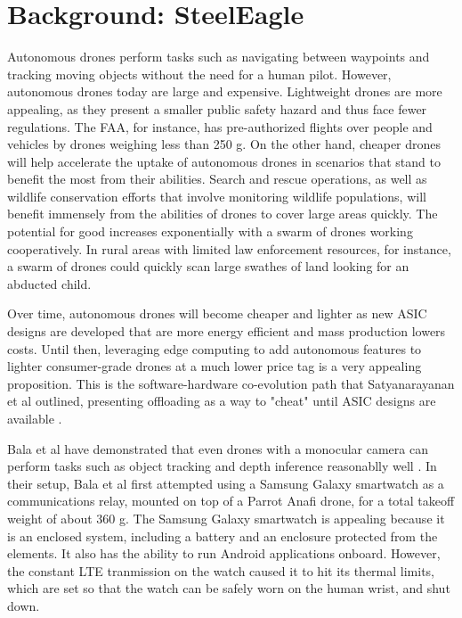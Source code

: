 \section{Background: SteelEagle}

Autonomous drones perform tasks such as navigating between waypoints and
tracking moving objects without the need for a human pilot.  However,
autonomous drones today are large and expensive. Lightweight drones are more
appealing, as they present a smaller public safety hazard and thus face fewer
regulations. The FAA, for instance, has pre-authorized flights over people and
vehicles by drones weighing less than 250 g. On the other hand, cheaper drones
will help accelerate the uptake of autonomous drones in scenarios that stand to
benefit the most from their abilities. Search and rescue operations, as well as
wildlife conservation efforts that involve monitoring wildlife populations,
will benefit immensely from the abilities of drones to cover large areas
quickly. The potential for good increases exponentially with a swarm of drones
working cooperatively. In rural areas with limited law enforcement resources,
for instance, a swarm of drones could quickly scan large swathes of land
looking for an abducted child.

Over time, autonomous drones will
become cheaper and lighter as new ASIC designs are developed that are more
energy efficient and mass production lowers costs. Until then, leveraging edge
computing to add autonomous features to lighter consumer-grade drones at a much
lower price tag is a very appealing proposition. This is the software-hardware
co-evolution path that Satyanarayanan et al outlined, presenting offloading as
a way to "cheat" until ASIC designs are available \cite{satya21}.

Bala et al have demonstrated that even drones with a monocular camera can
perform tasks such as object tracking and depth inference reasonablly
well \cite{bala2024}. In their setup, Bala et al first attempted using a Samsung
Galaxy smartwatch as a communications relay, mounted on top of a Parrot Anafi
drone, for a total takeoff weight of about 360 g. The Samsung Galaxy smartwatch
is appealing because it is an enclosed system, including a battery and an
enclosure protected from the elements. It also has the ability to run Android
applications onboard.  However, the constant LTE tranmission on the watch
caused it to hit its thermal limits, which are set so that the watch can be
safely worn on the human wrist, and shut down.

